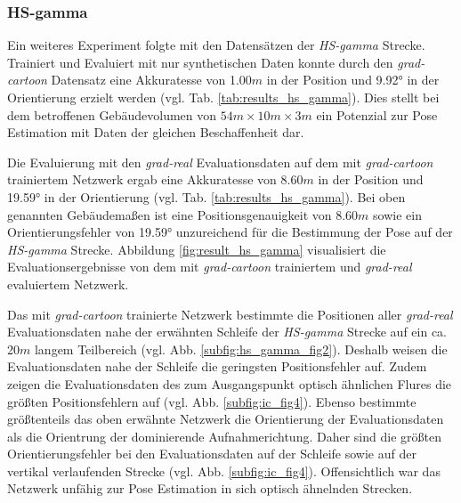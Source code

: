\subsubsection{HS-gamma}


Ein weiteres Experiment folgte mit den Datensätzen der \textit{HS-gamma} Strecke. Trainiert und Evaluiert mit nur synthetischen Daten konnte durch den \textit{grad-cartoon} Datensatz eine Akkuratesse von 1.00$m$ in der Position und 9.92° in der Orientierung erzielt werden (vgl. Tab. \ref{tab:results_hs_gamma}).  Dies stellt bei dem betroffenen Gebäudevolumen von $54m \times 10m \times 3m$ ein Potenzial zur Pose Estimation mit Daten der gleichen Beschaffenheit dar.

Die Evaluierung mit den \textit{grad-real} Evaluationsdaten auf dem mit \textit{grad-cartoon} trainiertem Netzwerk ergab eine Akkuratesse von 8.60$m$ in der Position und 19.59° in der Orientierung (vgl. Tab. \ref{tab:results_hs_gamma}). Bei oben genannten Gebäudemaßen ist eine Positionsgenauigkeit von 8.60$m$ sowie ein Orientierungsfehler von 19.59° unzureichend für die Bestimmung der Pose auf der \textit{HS-gamma} Strecke. Abbildung \ref{fig:result_hs_gamma} visualisiert die Evaluationsergebnisse von dem mit \textit{grad-cartoon} trainiertem und \textit{grad-real} evaluiertem Netzwerk.

Das mit \textit{grad-cartoon} trainierte Netzwerk bestimmte die Positionen aller \textit{grad-real} Evaluationsdaten nahe der erwähnten Schleife der \textit{HS-gamma} Strecke auf ein ca. 20$m$ langem Teilbereich (vgl. Abb.  \ref{subfig:hs_gamma_fig2}). Deshalb weisen die Evaluationsdaten nahe der Schleife die geringsten Positionsfehler auf. Zudem zeigen die Evaluationsdaten des zum Ausgangspunkt optisch ähnlichen Flures die größten Positionsfehlern auf (vgl. Abb. \ref{subfig:ic_fig4}). Ebenso bestimmte größtenteils das oben erwähnte Netzwerk die Orientierung der Evaluationsdaten als die Orientrung der dominierende Aufnahmerichtung. Daher sind die größten Orientierungsfehler bei den Evaluationsdaten auf der Schleife sowie auf der vertikal verlaufenden Strecke  (vgl. Abb. \ref{subfig:ic_fig4}). Offensichtlich war das Netzwerk unfähig zur Pose Estimation in sich optisch ähnelnden Strecken.


